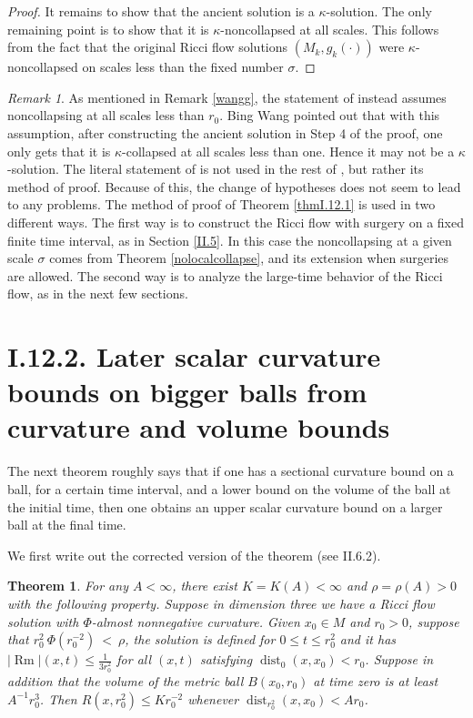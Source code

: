 \documentclass[12pt]{amsart}
\newcommand{\dist}{\operatorname{dist}}
\newcommand{\Rm}{\operatorname{Rm}}
\numberwithin{equation}{section}
\theoremstyle{plain}
\newtheorem{theorem}[equation]{Theorem}
\theoremstyle{definition}
\theoremstyle{remark}
\newtheorem{remark}[equation]{Remark}
\begin{document}
\begin{proof}
It remains to show that the ancient solution is a $\kappa$-solution.
The only remaining point is to show that it is $\kappa$-noncollapsed
at all scales. This follows from the fact that the original Ricci
flow solutions $(M_k, g_k(\cdot))$ were $\kappa$-noncollapsed on 
scales less than the fixed number $\sigma$.  
\end{proof}

\begin{remark} \label{wang}
As mentioned in Remark \ref{wangg}, the statement of 
\cite[Theorem 12.1]{Perelman} instead assumes noncollapsing at all
scales less than $r_0$. Bing Wang pointed out that with this
assumption, after constructing the ancient solution in Step 4
of the proof, one only gets that it is $\kappa$-collapsed at
all scales less than one. Hence it may not be a $\kappa$-solution.
The literal statement of \cite[Theorem 12.1]{Perelman} is not
used in the rest of \cite{Perelman,Perelman2}, but rather its
method of proof.  Because of this, the change of hypotheses 
does not seem to lead to any problems. The method of proof
of Theorem \ref{thmI.12.1} is used in two different ways.
The first way is to construct the Ricci flow with surgery on a
fixed finite time interval, as in Section \ref{II.5}.
In this case the
noncollapsing at a given scale $\sigma$ comes from 
Theorem \ref{nolocalcollapse}, and its extension when surgeries
are allowed.  The second way is to analyze the large-time
behavior of the Ricci flow, as in the next few sections.
\end{remark}
 
\section{I.12.2. Later scalar curvature bounds on bigger balls
from curvature and volume bounds}
\label{I.12.2}

The next theorem roughly says that if one has a sectional curvature bound on a
ball, for a certain time interval, and
a lower bound on the volume of the ball at the initial time, then one obtains
an upper scalar curvature bound on a larger ball at the final time.

We first write out the corrected version of the theorem
(see II.6.2).
\begin{theorem} \label{thmI.12.2}
For any $A < \infty$, there exist $K = K(A) < \infty$ and
$\rho = \rho(A) >  0$ with the following property. Suppose in
dimension three we have a Ricci flow solution with
$\Phi$-almost nonnegative curvature.
Given $x_0 \in M$ and $r_0 > 0$, suppose that 
$r_0^2 \: \Phi(r_0^{-2}) \: < \: \rho$,
the solution is defined for
$0 \le t \le r_0^2$ and it has 
$|\Rm|(x, t) \le \frac{1}{3r_0^{2}}$
for all $(x, t)$ satisfying $\dist_0(x, x_0) < r_0$. Suppose in
addition that the volume of the metric ball $B(x_0, r_0)$ at
time zero is at least $A^{-1} r_0^3$.
Then $R(x, r_0^2) \le K r_0^{-2}$ whenever $\dist_{r_0^2}(x, x_0) <
A r_0$.
\end{theorem}
\end{document}
